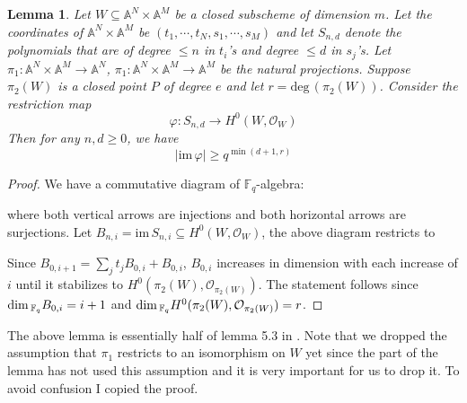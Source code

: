 \documentclass[12pt]{article}
\theoremstyle{plain}
\newtheorem{lemma}[equation]{Lemma}
\theoremstyle{definition}
\newcommand{\IA}{\mathbb{A}}
\newcommand{\IF}{\mathbb{F}}
\newcommand{\sO}{\mathcal{O}}
\renewcommand{\deg}{\mathrm{deg}\,}
\renewcommand\dim{{\rm dim\,}}
\newcommand{\<}{\langle}
\renewcommand{\>}{\rangle}
\newcommand{\im}{\mathrm{im}\,}
\begin{document}
\begin{lemma}
Let $W \subseteq \IA^N \times \IA^M$ be a closed subscheme of dimension $m$. Let the coordinates of $\IA^N \times \IA^M$ be $(t_1, \cdots, t_N, s_1, \cdots, s_M)$ and let $S_{n, d}$ denote the polynomials that are of degree $\le n$ in $t_i$'s and degree $\le d$ in $s_j$'s. Let $\pi_1 : \IA^N \times \IA^M \to \IA^N$, $\pi_1 : \IA^N \times \IA^M \to \IA^M$ be the natural projections. Suppose $\pi_2(W)$ is a closed point $P$ of degree $e$ and let $r = \deg(\pi_2(W))$. Consider the restriction map 
$$ \varphi : S_{n, d} \to H^0(W, \sO_W) $$
Then for any $n, d \ge 0$, we have
$$ |\im \varphi| \ge q^{\min(d + 1, r)} $$
\end{lemma}
\begin{proof}
We have a commutative diagram of $\IF_q$-algebra:
\begin{center}
\end{center}
where both vertical arrows are injections and both horizontal arrows are surjections. Let $B_{n, i} = \im S_{n, i} \subseteq H^0(W, \sO_W)$, the above diagram restricts to 
\begin{center}
\end{center}
Since $B_{0, i + 1} = \sum_j t_j B_{0, i} + B_{0, i}$, $B_{0, i}$ increases in dimension with each increase of $i$ until it stabilizes to $H^0(\pi_2(W), \sO_{\pi_2(W)})$. The statement follows since $\dim_{\IF_q} B_{0, i} = i + 1$ and $\dim_{\IF_q}H^0(\pi_2(W), \sO_{\pi_2(W)}) = r$. 
\end{proof}
The above lemma is essentially half of lemma 5.3 in \cite{Wood}. Note that we dropped the assumption that $\pi_1$ restricts to an isomorphism on $W$ yet since the part of the lemma has not used this assumption and it is very important for us to drop it. To avoid confusion I copied the proof. 
\end{document}
